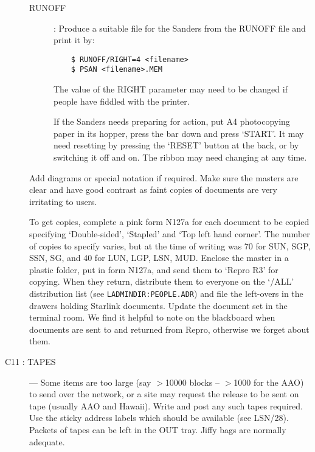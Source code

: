 \begin{description}
\begin{description}
\item [RUNOFF] :
Produce a suitable file for the Sanders from the RUNOFF file and print it by:
\begin{verbatim}
    $ RUNOFF/RIGHT=4 <filename>
    $ PSAN <filename>.MEM
\end{verbatim}
The value of the RIGHT parameter may need to be changed if people have fiddled
with the printer.

If the Sanders needs preparing for action, put A4 photocopying paper in its
hopper, press the bar down and press `START'.
It may need resetting by pressing the `RESET' button at the back, or by
switching it off and on.
The ribbon may need changing at any time.
\end{description}

Add diagrams or special notation if required.
Make sure the masters are clear and have good contrast as faint copies of
documents are very irritating to users.

To get copies, complete a pink form N127a for each document to be copied
specifying `Double-sided', `Stapled' and `Top left hand corner'.
The number of copies to specify varies, but at the time of writing was 70 for
SUN, SGP, SSN, SG, and 40 for LUN, LGP, LSN, MUD.
Enclose the master in a plastic folder, put in form N127a, and send them to
`Repro R3' for copying.
When they return, distribute them to everyone on the `/ALL' distribution list
(see {\tt LADMINDIR:PEOPLE.ADR}) and file the left-overs in the drawers holding
Starlink documents.
Update the document set in the terminal room.
We find it helpful to note on the blackboard when documents are sent to and
returned from Repro, otherwise we forget about them.

\item [C11 : TAPES] ---
Some items are too large (say $>$10000 blocks -- $>$1000 for the AAO) to send
over the network, or a site may request the release to be sent on tape
(usually AAO and Hawaii).
Write and post any such tapes required.
Use the sticky address labels which should be available (see LSN/28).
Packets of tapes can be left in the OUT tray.
Jiffy bags are normally adequate.




\end{description}
